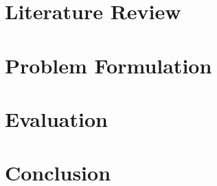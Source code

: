 \documentclass[11pt,a4paper]{article}
\theoremstyle{definition}
\theoremstyle{remark}
\begin{document}
\section{Literature Review}
\label{sec:literature}


\FloatBarrier


\section{Problem Formulation}
\label{sec:problem}


\FloatBarrier


\section{Evaluation}
\label{sec:evaluation}


\FloatBarrier


\section{Conclusion}
\label{sec:conclusion}


\FloatBarrier







\clearpage
\appendix
\end{document}
